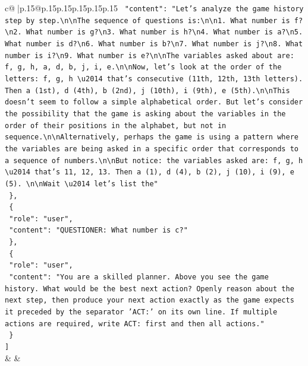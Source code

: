 \documentclass{article}
\begin{document}
{\begin{supertabular}{c@{$\;$}|p{.15\linewidth}@{}p{.15\linewidth}p{.15\linewidth}p{.15\linewidth}p{.15\linewidth}p{.15\linewidth}}
{{{\texttt{    "content": "Let's analyze the game history step by step.\textbackslash{}n\textbackslash{}nThe sequence of questions is:\textbackslash{}n\textbackslash{}n1. What number is f?\textbackslash{}n2. What number is g?\textbackslash{}n3. What number is h?\textbackslash{}n4. What number is a?\textbackslash{}n5. What number is d?\textbackslash{}n6. What number is b?\textbackslash{}n7. What number is j?\textbackslash{}n8. What number is i?\textbackslash{}n9. What number is e?\textbackslash{}n\textbackslash{}nThe variables asked about are: f, g, h, a, d, b, j, i, e.\textbackslash{}n\textbackslash{}nNow, let's look at the order of the letters: f, g, h \textbackslash{}u2014 that's consecutive (11th, 12th, 13th letters). Then a (1st), d (4th), b (2nd), j (10th), i (9th), e (5th).\textbackslash{}n\textbackslash{}nThis doesn't seem to follow a simple alphabetical order. But let's consider the possibility that the game is asking about the variables in the order of their positions in the alphabet, but not in sequence.\textbackslash{}n\textbackslash{}nAlternatively, perhaps the game is using a pattern where the variables are being asked in a specific order that corresponds to a sequence of numbers.\textbackslash{}n\textbackslash{}nBut notice: the variables asked are: f, g, h \textbackslash{}u2014 that's 11, 12, 13. Then a (1), d (4), b (2), j (10), i (9), e (5). \textbackslash{}n\textbackslash{}nWait \textbackslash{}u2014 let's list the"} \\
\texttt{  \},} \\
\texttt{  \{} \\
\texttt{    "role": "user",} \\
\texttt{    "content": "QUESTIONER: What number is c?"} \\
\texttt{  \},} \\
\texttt{  \{} \\
\texttt{    "role": "user",} \\
\texttt{    "content": "You are a skilled planner. Above you see the game history. What would be the best next action? Openly reason about the next step, then produce your next action exactly as the game expects it preceded by the separator 'ACT:' on its own line. If multiple actions are required, write ACT: first and then all actions."} \\
\texttt{  \}} \\
\texttt{{]}} \\
            }
        }
    }
    & & \\ \\


\end{supertabular}}
\end{document}

